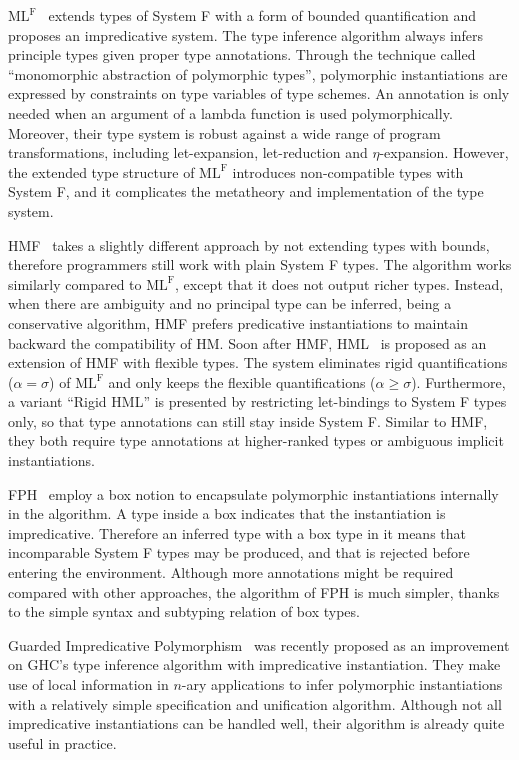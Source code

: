 $\text{ML}^\text{F}$~\citep{le2003ml,remy2008from,Botlan2009recasting}
extends types of System F with a form of bounded quantification
and proposes an impredicative system.
The type inference algorithm always infers principle types given proper type annotations.
Through the technique called ``monomorphic abstraction of polymorphic types'',
polymorphic instantiations are expressed by constraints
on type variables of type schemes.
An annotation is only needed when an argument of a lambda function
is used polymorphically.
Moreover, their type system is robust against a wide range of program transformations,
including let-expansion, let-reduction and $\eta$-expansion.
However, the extended type structure of $\text{ML}^\text{F}$
introduces non-compatible types with System F,
and it complicates the metatheory and implementation of the type system.

HMF~\citep{leijen2008hmf} takes a slightly different approach
by not extending types with bounds,
therefore programmers still work with plain System F types.
The algorithm works similarly compared to $\text{ML}^\text{F}$,
except that it does not output richer types.
Instead, when there are ambiguity and no principal type can be inferred,
being a conservative algorithm,
HMF prefers predicative instantiations
to maintain backward the compatibility of HM.
Soon after HMF, HML~\citep{leijen2009flexible} is proposed as
an extension of HMF with flexible types.
The system eliminates rigid quantifications ($\alpha = \sigma$)
of $\text{ML}^\text{F}$ and only keeps the flexible quantifications ($\alpha \ge \sigma$).
Furthermore, a variant ``Rigid HML'' is presented
by restricting let-bindings to System F types only,
so that type annotations can still stay inside System F.
Similar to HMF, they both require type annotations at higher-ranked
types or ambiguous implicit instantiations.

FPH~\citep{vytiniotis2008fph} employ a box notion \framebox{$\sigma$} to
encapsulate polymorphic instantiations internally in the algorithm.
A type inside a box indicates that the instantiation is impredicative.
Therefore an inferred type with a box type in it means that
incomparable System F types may be produced,
and that is rejected before entering the environment.
Although more annotations might be required compared with other approaches,
the algorithm of FPH is much simpler,
thanks to the simple syntax and subtyping relation of box types.


Guarded Impredicative Polymorphism~\citep{Serrano2018} was recently proposed
as an improvement on GHC's type inference algorithm with impredicative instantiation.
They make use of local information in $n$-ary applications to
infer polymorphic instantiations with a relatively simple specification and unification algorithm.
Although not all impredicative instantiations can be handled well,
their algorithm is already quite useful in practice.


